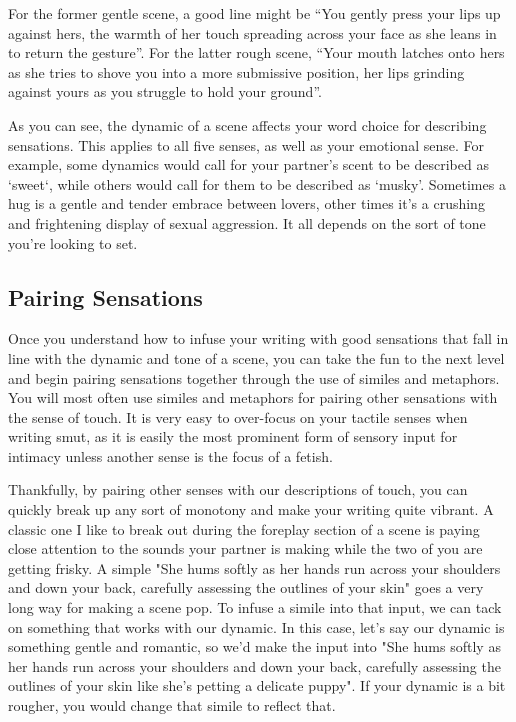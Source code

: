 ﻿\documentclass[Coomer-main.tex]{subfiles}
\begin{document}
For the former gentle scene, a good line might be “You gently press your lips up against hers, the warmth of her touch spreading across your face as she leans in to return the gesture”.
For the latter rough scene, “Your mouth latches onto hers as she tries to shove you into a more submissive position, her lips grinding against yours as you struggle to hold your ground”.

As you can see, the dynamic of a scene affects your word choice for describing sensations.
This applies to all five senses, as well as your emotional sense.
For example, some dynamics would call for your partner's scent to be described as ‘sweet‘, while others would call for them to be described as ‘musky’.
Sometimes a hug is a gentle and tender embrace between lovers, other times it’s a crushing and frightening display of sexual aggression.
It all depends on the sort of tone you're looking to set.

\subsection{Pairing Sensations}

Once you understand how to infuse your writing with good sensations that fall in line with the dynamic and tone of a scene, you can take the fun to the next level and begin pairing sensations together through the use of similes and metaphors.
You will most often use similes and metaphors for pairing other sensations with the sense of touch.
It is very easy to over-focus on your tactile senses when writing smut, as it is easily the most prominent form of sensory input for intimacy unless another sense is the focus of a fetish.

Thankfully, by pairing other senses with our descriptions of touch, you can quickly break up any sort of monotony and make your writing quite vibrant.
A classic one I like to break out during the foreplay section of a scene is paying close attention to the sounds your partner is making while the two of you are getting frisky.
A simple "She hums softly as her hands run across your shoulders and down your back, carefully assessing the outlines of your skin" goes a very long way for making a scene pop.
To infuse a simile into that input, we can tack on something that works with our dynamic.
In this case, let's say our dynamic is something gentle and romantic, so we'd make the input into "She hums softly as her hands run across your shoulders and down your back, carefully assessing the outlines of your skin like she's petting a delicate puppy".
If your dynamic is a bit rougher, you would change that simile to reflect that.
\end{document}
